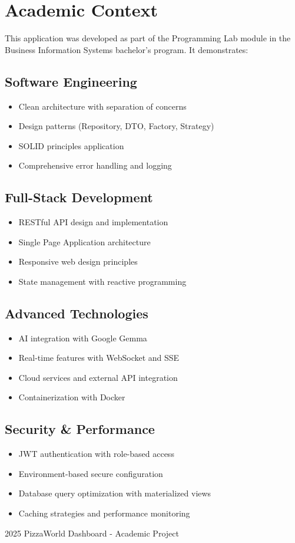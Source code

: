 \documentclass[11pt,a4paper]{article}
\begin{document}
\section{Academic Context}

This application was developed as part of the Programming Lab module in the Business Information Systems bachelor's program. It demonstrates:

\subsection{Software Engineering}
\begin{itemize}[leftmargin=*]
    \item Clean architecture with separation of concerns
    \item Design patterns (Repository, DTO, Factory, Strategy)
    \item SOLID principles application
    \item Comprehensive error handling and logging
\end{itemize}

\subsection{Full-Stack Development}
\begin{itemize}[leftmargin=*]
    \item RESTful API design and implementation
    \item Single Page Application architecture
    \item Responsive web design principles
    \item State management with reactive programming
\end{itemize}

\subsection{Advanced Technologies}
\begin{itemize}[leftmargin=*]
    \item AI integration with Google Gemma
    \item Real-time features with WebSocket and SSE
    \item Cloud services and external API integration
    \item Containerization with Docker
\end{itemize}

\subsection{Security \& Performance}
\begin{itemize}[leftmargin=*]
    \item JWT authentication with role-based access
    \item Environment-based secure configuration
    \item Database query optimization with materialized views
    \item Caching strategies and performance monitoring
\end{itemize}

\vfill

\begin{center}
{\small \textcopyright{} 2025 PizzaWorld Dashboard - Academic Project}
\end{center}
\end{document}
